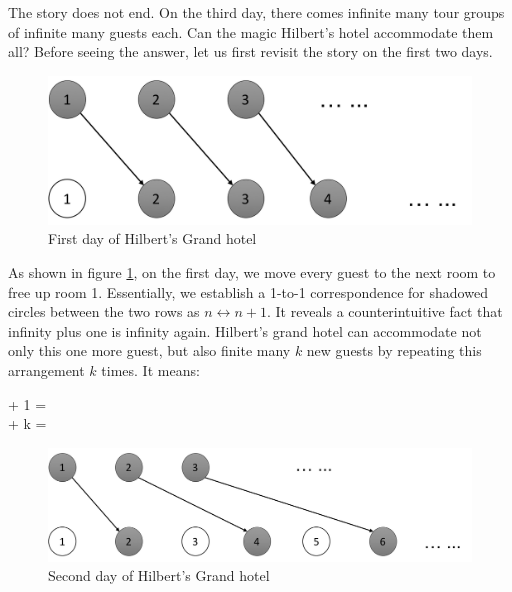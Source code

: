 \documentclass{article}
\begin{document}
The story does not end. On the third day, there comes infinite many tour groups of infinite many guests each. Can the magic Hilbert's hotel accommodate them all? Before seeing the answer, let us first revisit the story on the first two days.

\begin{figure}[htbp]
 \centering
 \includegraphics[scale=0.4]{img/Hilbert-hotel-1.png}
 \caption{First day of Hilbert's Grand hotel}
 \label{fig:Hilbert-hotel-1}
\end{figure}

As shown in figure \ref{fig:Hilbert-hotel-1}, on the first day, we move every guest to the next room to free up room 1. Essentially, we establish a 1-to-1 correspondence for shadowed circles between the two rows as $n \leftrightarrow n+1$. It reveals a counterintuitive fact that infinity plus one is infinity again. Hilbert's grand hotel can accommodate not only this one more guest, but also finite many $k$ new guests by repeating this arrangement $k$ times. It means:

\bean
\infty + 1 = \infty \\
\infty + k = \infty \\
\eean

\begin{figure}[htbp]
 \centering
 \includegraphics[scale=0.4]{img/Hilbert-hotel-2.png}
 \caption{Second day of Hilbert's Grand hotel}
 \label{fig:Hilbert-hotel-2}
\end{figure}
\end{document}
